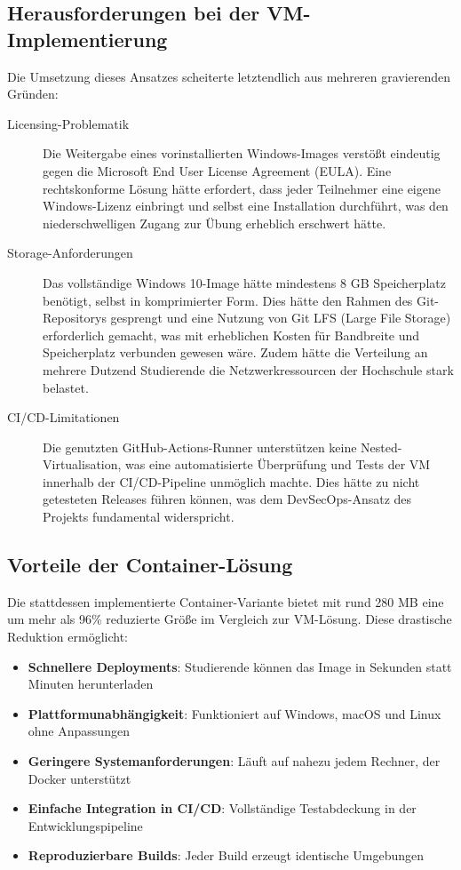 \documentclass{article}
\begin{document}
\subsection{Herausforderungen bei der VM-Implementierung}
Die Umsetzung dieses Ansatzes scheiterte letztendlich aus mehreren gravierenden Gründen:

\begin{description}
  \item[Licensing-Problematik] Die Weitergabe eines vorinstallierten Windows-Images verstößt eindeutig gegen die Microsoft End User License Agreement (EULA). Eine rechtskonforme Lösung hätte erfordert, dass jeder Teilnehmer eine eigene Windows-Lizenz einbringt und selbst eine Installation durchführt, was den niederschwelligen Zugang zur Übung erheblich erschwert hätte.
  
  \item[Storage-Anforderungen] Das vollständige Windows 10-Image hätte mindestens 8 GB Speicherplatz benötigt, selbst in komprimierter Form. Dies hätte den Rahmen des Git-Repositorys gesprengt und eine Nutzung von Git LFS (Large File Storage) erforderlich gemacht, was mit erheblichen Kosten für Bandbreite und Speicherplatz verbunden gewesen wäre. Zudem hätte die Verteilung an mehrere Dutzend Studierende die Netzwerkressourcen der Hochschule stark belastet.
  
  \item[CI/CD-Limitationen] Die genutzten GitHub-Actions-Runner unterstützen keine Nested-Virtualisation, was eine automatisierte Überprüfung und Tests der VM innerhalb der CI/CD-Pipeline unmöglich machte. Dies hätte zu nicht getesteten Releases führen können, was dem DevSecOps-Ansatz des Projekts fundamental widerspricht.
\end{description}

\subsection{Vorteile der Container-Lösung}
Die stattdessen implementierte Container-Variante bietet mit rund 280 MB eine um mehr als 96\% reduzierte Größe im Vergleich zur VM-Lösung. 
Diese drastische Reduktion ermöglicht:

\begin{itemize}
  \item \textbf{Schnellere Deployments}: Studierende können das Image in Sekunden statt Minuten herunterladen
  \item \textbf{Plattformunabhängigkeit}: Funktioniert auf Windows, macOS und Linux ohne Anpassungen
  \item \textbf{Geringere Systemanforderungen}: Läuft auf nahezu jedem Rechner, der Docker unterstützt
  \item \textbf{Einfache Integration in CI/CD}: Vollständige Testabdeckung in der Entwicklungspipeline
  \item \textbf{Reproduzierbare Builds}: Jeder Build erzeugt identische Umgebungen
\end{itemize}
\end{document}
